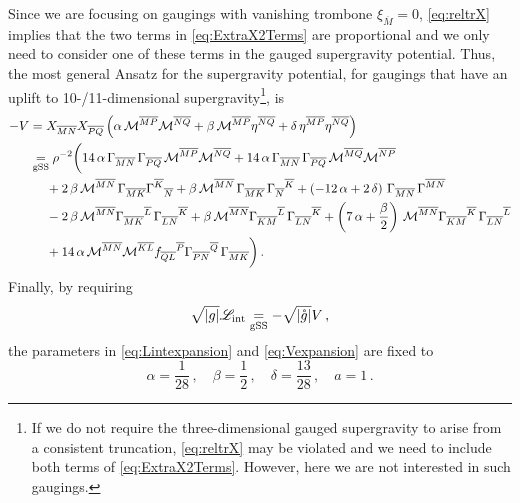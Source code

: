 \documentclass[a4paper, 11pt]{article}
\numberwithin{equation}{section}
\newcommand{\ov}[1]{\overline{#1}}
\newcommand{\+}{\oplus}
\newcommand{\fl}[1]{\ov{#1}}
\newcommand{\M}{\ensuremath{\mathcal{M}}\xspace}
\newcommand{\EM}[1]{\textcolor{red}{#1}}
\newcommand{\CE}[1]{\textcolor{darkorange}{#1}}
\begin{document}
Since we are focusing on gaugings with vanishing trombone $\xi_{\fl{M}} = 0$, \eqref{eq:reltrX} implies that the two terms in \eqref{eq:ExtraX2Terms} are proportional and we only need to consider one of these terms in the gauged supergravity potential. Thus, the most general Ansatz for the supergravity potential, for gaugings that have an uplift to 10-/11-dimensional supergravity\footnote{If we do not require the three-dimensional gauged supergravity to arise from a consistent truncation, \eqref{eq:reltrX} may be violated and we need to include both terms of \eqref{eq:ExtraX2Terms}. However, here we are not interested in such gaugings.}, is
\begin{equation} \label{eq:Vexpansion}
	\begin{aligned}
		-V &= X_{\fl{MN}}X_{\fl{PQ}}\left(\alpha\,\M^{\fl{MP}}\M^{\fl{NQ}}+\beta\,\M^{\fl{MP}}\eta^{\fl{NQ}}+\delta\,\eta^{\fl{MP}}\eta^{\fl{NQ}}
		\right) \\
		&\underset{\rm gSS}{=} \rho^{-2}\bigg(14\,\alpha\,\Gamma_{\fl{MN}}\,\Gamma_{\fl{PQ}}\,\M^{\fl{MP}}\M^{\fl{NQ}}+14\,\alpha\,\Gamma_{\fl{MN}}\,\Gamma_{\fl{PQ}}\,\M^{\fl{MQ}}\M^{\fl{NP}}\\
		&\ \quad +2\,\beta\,\M^{\fl{MN}}\,\Gamma_{\fl{MK}}\Gamma^{\fl{K}}{}_{\fl{N}}+\beta\,\M^{\fl{MN}}\,\Gamma_{\fl{MK}}\,\Gamma_{\fl{N}}{}^{\fl{K}}+\left(-12\,\alpha+2\,\delta
		\right)\,\Gamma_{\fl{MN}}\,\Gamma^{\fl{MN}}\\
		&\ \quad -2\,\beta\,\M^{\fl{MN}}\Gamma_{\fl{MK}}{}^{\fl{L}}\,\Gamma_{\fl{LN}}{}^{\fl{K}}+\beta\,\M^{\fl{MN}}\Gamma_{\fl{KM}}{}^{\fl{L}}\,\Gamma_{\fl{LN}}{}^{\fl{K}}+\left(7\,\alpha+\frac{\beta}{2}\right)\,\M^{\fl{MN}}\Gamma_{\fl{KM}}{}^{\fl{K}}\,\Gamma_{\fl{LN}}{}^{\fl{L}}\\
		&\ \quad +14\,\alpha\,\M^{\fl{MN}}\M^{\fl{KL}}f_{\fl{QL}}{}^{\fl{P}}\Gamma_{\fl{PN}}{}^{\fl{Q}}\,\Gamma_{\fl{MK}}\bigg)\,.
	\end{aligned}
\end{equation}
Finally, by requiring
\begin{equation}
	\sqrt{|g|} \mathscr{L}_{\rm int} \underset{\rm gSS}{=} - \sqrt{|\mathring{g}|} V \,,
\end{equation}
the parameters in \eqref{eq:Lintexpansion} and \eqref{eq:Vexpansion} are fixed to
\begin{equation}
	\alpha = \frac{1}{28}\,,\quad \beta = \frac{1}{2}\,, \quad \delta=\frac{13}{28}\,, \quad a=1 \,. %
\end{equation}
\end{document}
